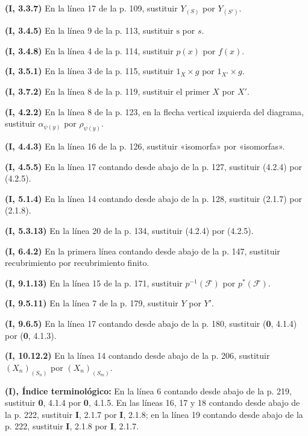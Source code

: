 \documentclass[10pt,oneside,openany]{book}
\theoremstyle{egaenv}\newtheorem*{env}{---}
\theoremstyle{egastatement}
\theoremstyle{egadescription}
\newcommand{\oldpage}[2][]{\marginnote{\normalfont\scriptsize\textbf{#1}\,|\,#2}\ignorespaces}
\begin{document}
\noindent\textbf{(I, 3.3.7)} En la línea 17 de la p. 109, sustituir
$Y_{(S)}$ por $Y_{(S')}$.

\noindent\textbf{(I, 3.4.5)} En la línea 9 de la p. 113, sustituir
$\mathrm s$ por $s$.

\noindent\textbf{(I, 3.4.8)} En la línea 4 de la p. 114, sustituir $p(x)$ por
$f(x)$.

\noindent\textbf{(I, 3.5.1)} En la línea 3 de la p. 115, sustituir
$1_X\times g$ por $1_{X'}\times g$.

\noindent\textbf{(I, 3.7.2)} En la línea 8 de la p. 119, sustituir el primer
$X$ por $X'$.

\noindent\textbf{(I, 4.2.2)} En la línea 8 de la p. 123, en la flecha vertical
izquierda del diagrama, sustituir $\alpha_{\psi(y)}$ por $\rho_{\psi(y)}$.

\noindent\textbf{(I, 4.4.3)} En la línea 16 de la p. 126, sustituir «isomorfa»
por «isomorfas».

\noindent\textbf{(I, 4.5.5)} En la línea 17 contando desde abajo de la p. 127,
sustituir (4.2.4) por (4.2.5).

\noindent\textbf{(I, 5.1.4)} En la línea 14 contando desde abajo de la p. 128,
sustituir (2.1.7) por (2.1.8).

\noindent\textbf{(I, 5.3.13)} En la línea 20 de la p. 134, sustituir (4.2.4)
por (4.2.5).

\noindent\textbf{(I, 6.4.2)} En la primera línea contando desde abajo de la
p. 147, sustituir recubrimiento por recubrimiento finito.

\noindent\textbf{(I, 9.1.13)} En la línea 15 de la p. 171, sustituir
$p^{-1}(\mathscr F)$ por $p^*(\mathscr F)$.

\noindent\textbf{(I, 9.5.11)} En la línea 7 de la p. 179, sustituir $Y$ por
$Y'$.

\noindent\textbf{(I, 9.6.5)} En la línea 17 contando desde abajo de la p. 180,
sustituir (\textbf{0}, 4.1.4) por (\textbf{0}, 4.1.3).

\noindent\textbf{(I, 10.12.2)} En la línea 14 contando desde abajo de la p.
206, sustituir $(X_n)_{(S_n)}$ por $(X_n)_{(S_m)}$.

\clearpage
\oldpage[III]{218}
\noindent\textbf{(I), Índice terminológico:} En la línea 6 contando desde
abajo de la p. 219, sustituir \textbf{0}, 4.1.4 por \textbf{0}, 4.1.5. En las líneas 16, 17 y 18
contando desde abajo de la p. 222, sustituir \textbf{I}, 2.1.7 por \textbf{I}, 2.1.8; en la línea
19 contando desde abajo de la p. 222, sustituir \textbf{I}, 2.1.8 por \textbf{I}, 2.1.7.
\end{document}
